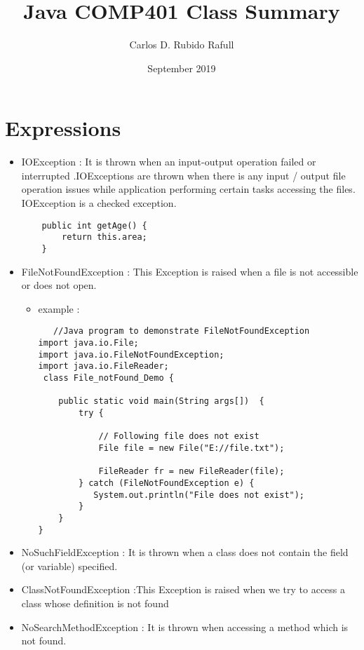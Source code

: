 \documentclass{article}
\title{Java COMP401 Class Summary}
\author{Carlos D. Rubido Rafull }
\date{September 2019}
\begin{document}
\maketitle

\section{Expressions}
\begin{itemize}
    \item IOException : It is thrown when an input-output operation failed or interrupted .IOExceptions are thrown when there is any input / output file operation issues while application performing certain tasks accessing the files. IOException is a checked exception.
    
    \begin{itemize}
    \begin{lstlisting}
    public int getAge() {
        return this.area;
    }
    \end{lstlisting}
    \end{itemize}
    \item FileNotFoundException : This Exception is raised when a file is not accessible or does not open.
    
    \begin{itemize}
    \item example :
    \begin{lstlisting}
   //Java program to demonstrate FileNotFoundException 
import java.io.File; 
import java.io.FileNotFoundException; 
import java.io.FileReader; 
 class File_notFound_Demo { 
  
    public static void main(String args[])  { 
        try { 
  
            // Following file does not exist 
            File file = new File("E://file.txt"); 
  
            FileReader fr = new FileReader(file); 
        } catch (FileNotFoundException e) { 
           System.out.println("File does not exist"); 
        } 
    } 
} 
    \end{lstlisting}
     \end{itemize}
    
    \item NoSuchFieldException : It is thrown when a class does not contain the field (or variable) specified.
    
    
    \item ClassNotFoundException :This Exception is raised when we try to access a class whose definition is not found
    
    \item NoSearchMethodException : It is thrown when accessing a method which is not found.
\end{itemize}
\end{document}
